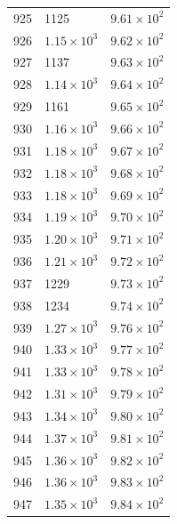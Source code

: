 \begin{table}[H]
\begin{tabular}{lll}
925 & 1125 & $\displaystyle 9.61 \times 10^{2}$ \\
926 & $\displaystyle 1.15 \times 10^{3}$ & $\displaystyle 9.62 \times 10^{2}$ \\
927 & 1137 & $\displaystyle 9.63 \times 10^{2}$ \\
928 & $\displaystyle 1.14 \times 10^{3}$ & $\displaystyle 9.64 \times 10^{2}$ \\
929 & 1161 & $\displaystyle 9.65 \times 10^{2}$ \\
930 & $\displaystyle 1.16 \times 10^{3}$ & $\displaystyle 9.66 \times 10^{2}$ \\
931 & $\displaystyle 1.18 \times 10^{3}$ & $\displaystyle 9.67 \times 10^{2}$ \\
932 & $\displaystyle 1.18 \times 10^{3}$ & $\displaystyle 9.68 \times 10^{2}$ \\
933 & $\displaystyle 1.18 \times 10^{3}$ & $\displaystyle 9.69 \times 10^{2}$ \\
934 & $\displaystyle 1.19 \times 10^{3}$ & $\displaystyle 9.70 \times 10^{2}$ \\
935 & $\displaystyle 1.20 \times 10^{3}$ & $\displaystyle 9.71 \times 10^{2}$ \\
936 & $\displaystyle 1.21 \times 10^{3}$ & $\displaystyle 9.72 \times 10^{2}$ \\
937 & 1229 & $\displaystyle 9.73 \times 10^{2}$ \\
938 & 1234 & $\displaystyle 9.74 \times 10^{2}$ \\
939 & $\displaystyle 1.27 \times 10^{3}$ & $\displaystyle 9.76 \times 10^{2}$ \\
940 & $\displaystyle 1.33 \times 10^{3}$ & $\displaystyle 9.77 \times 10^{2}$ \\
941 & $\displaystyle 1.33 \times 10^{3}$ & $\displaystyle 9.78 \times 10^{2}$ \\
942 & $\displaystyle 1.31 \times 10^{3}$ & $\displaystyle 9.79 \times 10^{2}$ \\
943 & $\displaystyle 1.34 \times 10^{3}$ & $\displaystyle 9.80 \times 10^{2}$ \\
944 & $\displaystyle 1.37 \times 10^{3}$ & $\displaystyle 9.81 \times 10^{2}$ \\
945 & $\displaystyle 1.36 \times 10^{3}$ & $\displaystyle 9.82 \times 10^{2}$ \\
946 & $\displaystyle 1.36 \times 10^{3}$ & $\displaystyle 9.83 \times 10^{2}$ \\
947 & $\displaystyle 1.35 \times 10^{3}$ & $\displaystyle 9.84 \times 10^{2}$ \\

\end{tabular}
\end{table}
